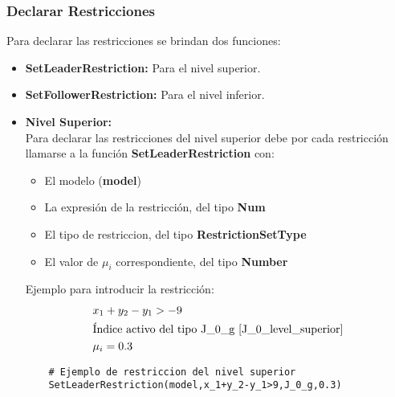 \subsubsection{Declarar Restricciones}

Para declarar las restricciones se brindan dos funciones:
\begin{itemize}
    \item \textbf{SetLeaderRestriction:} Para el nivel superior.
    \item \textbf{SetFollowerRestriction:} Para el nivel inferior.
\end{itemize}
\begin{itemize}
    \item \textbf{Nivel Superior:}\\

Para declarar las restricciones del nivel superior debe por cada restricción
llamarse a la función \textbf{SetLeaderRestriction} con:
\begin{itemize}
    \item El modelo (\textbf{model})
    \item La expresión de la restricción, del tipo \textbf{Num}
    \item El tipo de restriccion, del tipo \textbf{RestrictionSetType}
    \item El valor de $\mu_i$ correspondiente, del tipo \textbf{Number} 
\end{itemize}

Ejemplo para introducir la restricción:
\begin{align*}
    &x_1+y_2-y_1 > -9 \\
    &\text{Índice activo del tipo J\_0\_g \refeq{J_0_level_superior}}\\
    & \mu_i=0.3
\end{align*}

\begin{lstlisting}
    # Ejemplo de restriccion del nivel superior
    SetLeaderRestriction(model,x_1+y_2-y_1>9,J_0_g,0.3)
\end{lstlisting}


\end{itemize}
